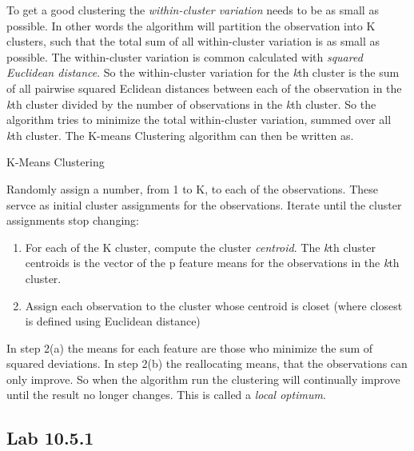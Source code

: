 To get a good clustering the \emph{within-cluster variation} needs to be as small as possible. In other words the algorithm will partition the observation into K clusters, such that the total sum of all within-cluster variation is as small as possible. The within-cluster variation is common calculated with \emph{squared Euclidean distance}.
So the within-cluster variation for the \emph{k}th cluster is the sum of all pairwise squared Eclidean distances between each of the observation in the \emph{k}th cluster divided by the number of observations in the \emph{k}th cluster.
So the algorithm tries to minimize the total within-cluster variation, summed over all \emph{k}th cluster.
The K-means Clustering algorithm can then be written as.

\begin{algorithm}
	\caption{K-Means Clustering}
	\label{algo:KMeansClustering}
	\begin{algorithmic}[1]
		\State Randomly assign a number, from 1 to K, to each of the observations. These servce as initial cluster assignments for the observations. 
		\State Iterate until the cluster assignments stop changing:
		\begin{enumerate}[label=(\alph*)]
			\item For each of the K cluster, compute the cluster \emph{centroid}. The \emph{k}th cluster centroids is the vector of the p feature means for the observations in the \emph{k}th cluster.
			\item Assign each observation to the cluster whose centroid is closet (where closest is defined using Euclidean distance) 
		\end{enumerate}
	\end{algorithmic}
\end{algorithm}

 In step 2(a) the means for each feature are those who minimize the sum of squared deviations. In step 2(b) the reallocating means, that the observations can only improve.
 So when the algorithm run the clustering will continually improve until the result no longer changes. This is called a \emph{local optimum}.
\subsection{Lab 10.5.1}

